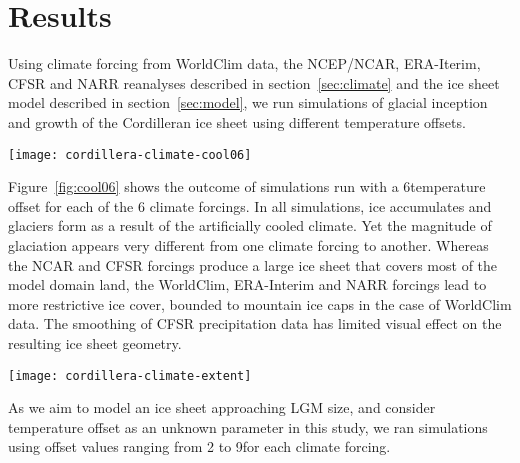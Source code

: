 
\section{Results}
\label{sec:results}

Using climate forcing from WorldClim data, the NCEP/NCAR, ERA-Iterim, CFSR and NARR reanalyses described in section~\ref{sec:climate} and the ice sheet model described in section~\ref{sec:model}, we run simulations of glacial inception and growth of the Cordilleran ice sheet using different temperature offsets.

\begin{figure*}[t]
	\vspace*{2mm}
	\begin{center}
		\texttt{[image: cordillera-climate-cool06]}
	\end{center}
	\caption{Ice surface topography (black contours every 1000\,m) and velocity (\unit{m\,yr^{-1}}) after 10\,kyr under a climate 6\degC colder than present for each climate forcing.}
	\label{fig:cool06}
\end{figure*}

Figure~\ref{fig:cool06} shows the outcome of simulations run with a 6\degC temperature offset for each of the 6 climate forcings. In all simulations, ice accumulates and glaciers form as a result of the artificially cooled climate. Yet the magnitude of glaciation appears very different from one climate forcing to another. Whereas the NCAR and CFSR forcings produce a large ice sheet that covers most of the model domain land, the WorldClim, ERA-Interim and NARR forcings lead to more restrictive ice cover, bounded to mountain ice caps in the case of WorldClim data. The smoothing of CFSR precipitation data has limited visual effect on the resulting ice sheet geometry.

\begin{figure*}[t]
	\vspace*{2mm}
	\begin{center}
		\texttt{[image: cordillera-climate-extent]}
	\end{center}
	\caption{Extent of ice cover after 10\,kyr as a function of applied temperature offsets for each climate forcing.}
	\label{fig:extent}
\end{figure*}

As we aim to model an ice sheet approaching LGM size, and consider temperature offset as an unknown parameter in this study, we ran simulations using offset values ranging from 2 to 9\degC for each climate forcing.

